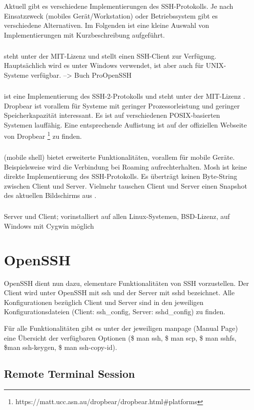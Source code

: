 \documentclass[ngerman,pdf]{wkcms}    %
\begin{document}
Aktuell gibt es verschiedene Implementierungen des SSH-Protokolls. Je nach Einsatzzweck (mobiles Gerät/Workstation) oder Betriebssystem gibt es verschiedene Alternativen. Im Folgenden ist eine kleine Auswahl von Implementierungen mit Kurzbeschreibung aufgeführt.

\subparagraph{} steht unter der MIT-Lizenz und stellt einen SSH-Client zur Verfügung. Hauptsächlich wird es unter Windows verwendet, ist aber auch für UNIX-Systeme verfügbar.\cite{putty}  --> Buch ProOpenSSH 

\subparagraph{ } ist eine Implementierung des SSH-2-Protokolls und steht unter der MIT-Lizenz \cite{dropbear}. Dropbear ist vorallem für Systeme mit geringer Prozessorleistung und geringer Speicherkapazität interessant. Es ist auf verschiedenen POSIX-basierten Systemen lauffähig. Eine entsprechende Auflistung ist auf der offiziellen Webseite von Dropbear \footnote{https://matt.ucc.asn.au/dropbear/dropbear.html\#platforms} zu finden.

\subparagraph{} (mobile shell) bietet erweiterte Funktionalitäten, vorallem für mobile Geräte. Beispielsweise wird die Verbindung bei Roaming aufrechterhalten. Mosh ist keine direkte Implementierung des SSH-Protokolls. Es überträgt keinen Byte-String zwischen Client und Server. Vielmehr tauschen Client und Server einen Snapshot des aktuellen Bildschirms aus \cite{mosh}.

\subparagraph{} Server und Client; vorinstalliert auf allen Linux-Systemen, BSD-Lizenz, auf Windows mit Cygwin möglich

\section{OpenSSH}

OpenSSH dient nun dazu, elementare Funktionalitäten von SSH vorzustellen. Der Client wird unter OpenSSH mit \IT ssh und der Server mit \IT sshd bezeichnet. Alle Konfigurationen bezüglich Client und Server sind in den jeweiligen Konfigurationsdateien (Client: ssh\_config, Server: sshd\_config) zu finden. 

Für alle Funktionalitäten gibt es unter der jeweiligen \IT manpage (Manual Page) eine Übersicht der verfügbaren Optionen (\$ man ssh, \$ man scp, \$ man sshfs, \$man ssh-keygen, \$ man ssh-copy-id). 

\subsection{Remote Terminal Session}
\end{document}
